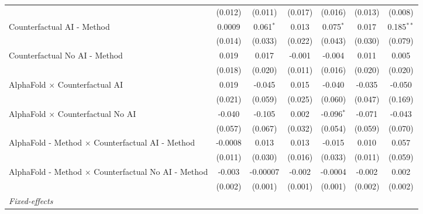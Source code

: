 \begin{tabular}{lcccccc}
                                                              & (0.012)       & (0.011)        & (0.017)       & (0.016)       & (0.013)       & (0.008)\\   
   Counterfactual AI - Method                                 & 0.0009        & 0.061$^{*}$    & 0.013         & 0.075$^{*}$   & 0.017         & 0.185$^{**}$\\   
                                                              & (0.014)       & (0.033)        & (0.022)       & (0.043)       & (0.030)       & (0.079)\\   
   Counterfactual No AI - Method                              & 0.019         & 0.017          & -0.001        & -0.004        & 0.011         & 0.005\\   
                                                              & (0.018)       & (0.020)        & (0.011)       & (0.016)       & (0.020)       & (0.020)\\   
   AlphaFold $\times$ Counterfactual AI                       & 0.019         & -0.045         & 0.015         & -0.040        & -0.035        & -0.050\\   
                                                              & (0.021)       & (0.059)        & (0.025)       & (0.060)       & (0.047)       & (0.169)\\   
   AlphaFold $\times$ Counterfactual No AI                    & -0.040        & -0.105         & 0.002         & -0.096$^{*}$  & -0.071        & -0.043\\   
                                                              & (0.057)       & (0.067)        & (0.032)       & (0.054)       & (0.059)       & (0.070)\\   
   AlphaFold - Method $\times$ Counterfactual AI - Method     & -0.0008       & 0.013          & 0.013         & -0.015        & 0.010         & 0.057\\   
                                                              & (0.011)       & (0.030)        & (0.016)       & (0.033)       & (0.011)       & (0.059)\\   
   AlphaFold - Method $\times$ Counterfactual No AI - Method  & -0.003        & -0.00007       & -0.002        & -0.0004       & -0.002        & 0.002\\   
                                                              & (0.002)       & (0.001)        & (0.001)       & (0.001)       & (0.002)       & (0.002)\\   
   \midrule
   \emph{Fixed-effects}\\

\end{tabular}
